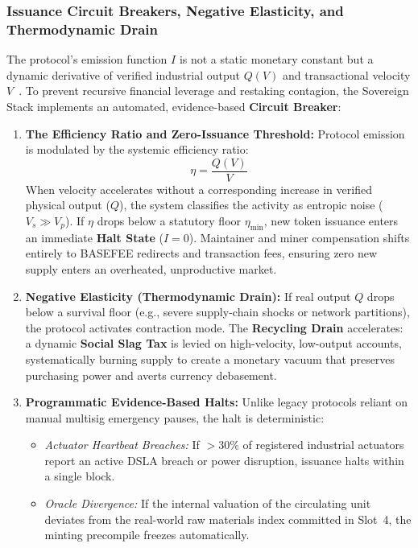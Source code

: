 \documentclass[a4paper,11pt,twoside,parskip=half-,headings=small]{scrartcl}
\begin{document}
\subsubsection{Issuance Circuit Breakers, Negative Elasticity, and Thermodynamic Drain}
\label{sec:circuit_breaker}

The protocol's emission function $I$ is not a static monetary constant but a dynamic derivative of verified industrial output $Q(V)$ and transactional velocity $V$~\cite{blum2024lightbook}. To prevent recursive financial leverage and restaking contagion, the Sovereign Stack implements an automated, evidence-based \textbf{Circuit Breaker}:
\begin{enumerate}[nosep]
  \item \textbf{The Efficiency Ratio and Zero-Issuance Threshold:} Protocol emission is modulated by the systemic efficiency ratio:
  \begin{equation}
    \eta = \frac{Q(V)}{V}
  \end{equation}
  When velocity accelerates without a corresponding increase in verified physical output ($Q$), the system classifies the activity as entropic noise ($V_s \gg V_p$). If $\eta$ drops below a statutory floor $\eta_{\min}$, new token issuance enters an immediate \textbf{Halt State} ($I = 0$). Maintainer and miner compensation shifts entirely to BASEFEE redirects and transaction fees, ensuring zero new supply enters an overheated, unproductive market.
  \item \textbf{Negative Elasticity (Thermodynamic Drain):} If real output $Q$ drops below a survival floor (e.g., severe supply-chain shocks or network partitions), the protocol activates contraction mode. The \textbf{Recycling Drain} accelerates: a dynamic \textbf{Social Slag Tax} is levied on high-velocity, low-output accounts, systematically burning supply to create a monetary vacuum that preserves purchasing power and averts currency debasement.
  \item \textbf{Programmatic Evidence-Based Halts:} Unlike legacy protocols reliant on manual multisig emergency pauses, the halt is deterministic:
  \begin{itemize}[nosep]
    \item \emph{Actuator Heartbeat Breaches:} If $>30\%$ of registered industrial actuators report an active DSLA breach or power disruption, issuance halts within a single block.
    \item \emph{Oracle Divergence:} If the internal valuation of the circulating unit deviates from the real-world raw materials index committed in Slot~4, the minting precompile freezes automatically.
  \end{itemize}
\end{enumerate}
\end{document}
